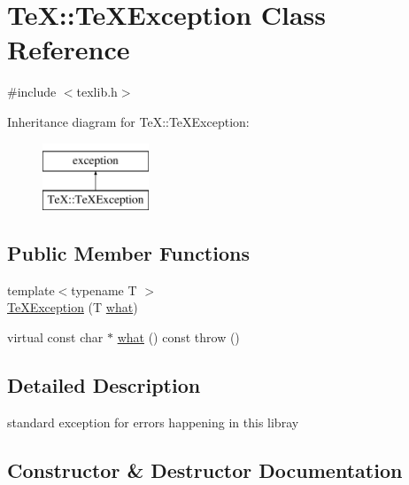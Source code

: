 \hypertarget{class_te_x_1_1_te_x_exception}{}\section{TeX\+:\+:Te\+X\+Exception Class Reference}
\label{class_te_x_1_1_te_x_exception}


{\ttfamily \#include $<$texlib.\+h$>$}

Inheritance diagram for TeX\+:\+:Te\+X\+Exception\+:\begin{figure}[H]
\begin{center}
\leavevmode
\includegraphics[height=2.000000cm]{class_te_x_1_1_te_x_exception}
\end{center}
\end{figure}
\subsection*{Public Member Functions}
\begin{DoxyCompactItemize}
\item 
{\footnotesize template$<$typename T $>$ }\\\hyperlink{class_te_x_1_1_te_x_exception_a71087ed70be236df40e20fe737a1ba1b}{Te\+X\+Exception} (T \hyperlink{class_te_x_1_1_te_x_exception_a189f589619c4ee5106af390c7a8ac3f5}{what})
\item 
virtual const char $\ast$ \hyperlink{class_te_x_1_1_te_x_exception_a189f589619c4ee5106af390c7a8ac3f5}{what} () const  throw ()
\end{DoxyCompactItemize}


\subsection{Detailed Description}
standard exception for errors happening in this libray 

\subsection{Constructor \& Destructor Documentation}
\mbox{\label{class_te_x_1_1_te_x_exception_a71087ed70be236df40e20fe737a1ba1b}} 
